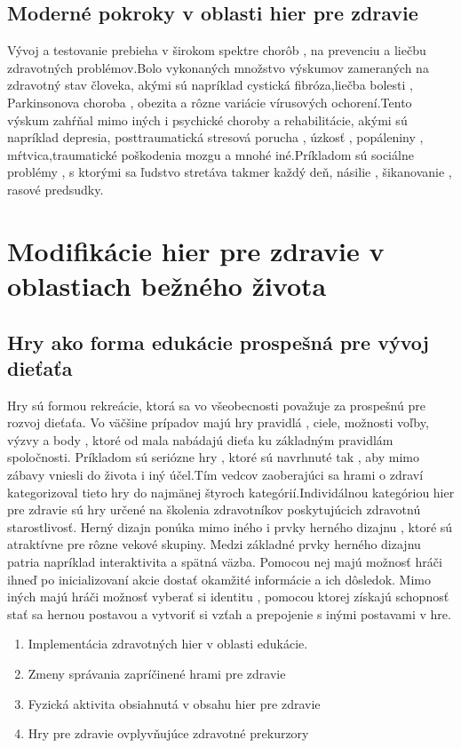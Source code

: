\documentclass[10pt,oneside,slovak,a4paper]{article}
\begin{document}
\subsection{Moderné pokroky v oblasti hier pre zdravie}
Vývoj a testovanie prebieha v širokom spektre chorôb , na prevenciu a liečbu zdravotných problémov.Bolo vykonaných množstvo výskumov zameraných na zdravotný stav človeka, akými sú napríklad cystická fibróza,liečba bolesti , Parkinsonova choroba , obezita a rôzne variácie vírusových ochorení.Tento výskum zahŕňal mimo iných i psychické  choroby a rehabilitácie, akými sú napríklad depresia, posttraumatická stresová porucha , úzkosť , popáleniny , mŕtvica,traumatické poškodenia mozgu a mnohé iné.Príkladom sú sociálne problémy , s ktorými sa ľudstvo stretáva takmer každý deň, násilie , šikanovanie , rasové predsudky\cite{bworld}.
\label{nejaka}
\section{Modifikácie hier pre zdravie v oblastiach bežného života}

\subsection{Hry ako forma edukácie prospešná pre vývoj dieťaťa}
Hry sú formou rekreácie, ktorá sa vo všeobecnosti považuje za prospešnú pre rozvoj dieťaťa. Vo väčšine prípadov majú hry pravidlá , ciele, možnosti voľby, výzvy a body , ktoré od mala nabádajú dieťa ku základným pravidlám spoločnosti. Príkladom sú seriózne hry , ktoré sú navrhnuté tak , aby mimo zábavy vniesli do života i iný účel.Tím vedcov zaoberajúci sa hrami o zdraví kategorizoval tieto hry do najmänej štyroch kategórií.Individálnou kategóriou hier pre zdravie sú hry určené na školenia zdravotníkov poskytujúcich zdravotnú starostlivosť. Herný dizajn ponúka mimo iného i prvky herného dizajnu , ktoré sú atraktívne pre rôzne vekové skupiny. Medzi základné prvky herného dizajnu patria napríklad interaktivita a spätná väzba. Pomocou nej majú možnosť hráči ihneď po inicializovaní akcie dostať okamžité informácie a ich dôsledok. Mimo iných majú hráči možnosť vyberať si identitu , pomocou ktorej získajú schopnosť stať sa hernou postavou a vytvoriť si vzťah a prepojenie s inými postavami v hre.
\begin{enumerate}
    \item{Implementácia zdravotných hier v oblasti edukácie.}
    \item{Zmeny správania zapríčinené hrami pre zdravie}
    \item{Fyzická aktivita obsiahnutá v obsahu hier pre zdravie}
    \item{Hry pre zdravie ovplyvňujúce zdravotné prekurzory}
\end{enumerate}
\end{document}
